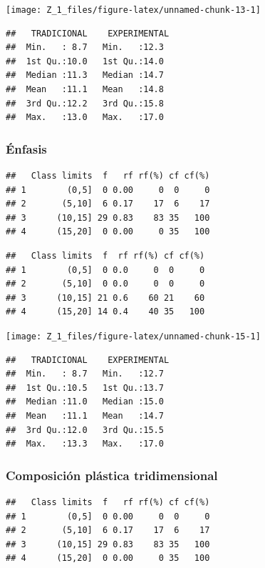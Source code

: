 \documentclass[12pt,]{report}
\begin{document}
\begin{center}\texttt{[image: Z\_1\_files/figure-latex/unnamed-chunk-13-1]} \end{center}

\begin{verbatim}
##   TRADICIONAL    EXPERIMENTAL 
##  Min.   : 8.7   Min.   :12.3  
##  1st Qu.:10.0   1st Qu.:14.0  
##  Median :11.3   Median :14.7  
##  Mean   :11.1   Mean   :14.8  
##  3rd Qu.:12.2   3rd Qu.:15.8  
##  Max.   :13.0   Max.   :17.0
\end{verbatim}

\hypertarget{uxe9nfasis}{%
\subsubsection{Énfasis}\label{uxe9nfasis}}

\begin{verbatim}
##   Class limits  f   rf rf(%) cf cf(%)
## 1        (0,5]  0 0.00     0  0     0
## 2       (5,10]  6 0.17    17  6    17
## 3      (10,15] 29 0.83    83 35   100
## 4      (15,20]  0 0.00     0 35   100
\end{verbatim}

\begin{verbatim}
##   Class limits  f  rf rf(%) cf cf(%)
## 1        (0,5]  0 0.0     0  0     0
## 2       (5,10]  0 0.0     0  0     0
## 3      (10,15] 21 0.6    60 21    60
## 4      (15,20] 14 0.4    40 35   100
\end{verbatim}

\begin{center}\texttt{[image: Z\_1\_files/figure-latex/unnamed-chunk-15-1]} \end{center}

\begin{verbatim}
##   TRADICIONAL    EXPERIMENTAL 
##  Min.   : 8.7   Min.   :12.7  
##  1st Qu.:10.5   1st Qu.:13.7  
##  Median :11.0   Median :15.0  
##  Mean   :11.1   Mean   :14.7  
##  3rd Qu.:12.0   3rd Qu.:15.5  
##  Max.   :13.3   Max.   :17.0
\end{verbatim}

\hypertarget{composiciuxf3n-pluxe1stica-tridimensional-1}{%
\subsubsection{Composición plástica tridimensional}\label{composiciuxf3n-pluxe1stica-tridimensional-1}}

\begin{verbatim}
##   Class limits  f   rf rf(%) cf cf(%)
## 1        (0,5]  0 0.00     0  0     0
## 2       (5,10]  6 0.17    17  6    17
## 3      (10,15] 29 0.83    83 35   100
## 4      (15,20]  0 0.00     0 35   100
\end{verbatim}
\end{document}
